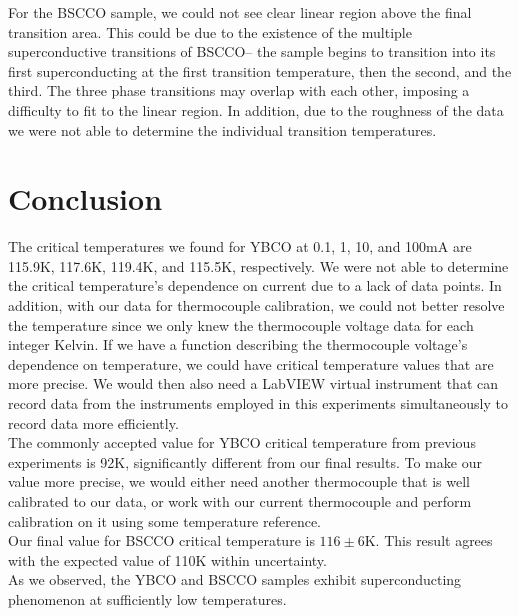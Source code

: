 \documentclass[prb,preprint]{revtex4-1}
\begin{document}
For the BSCCO sample, we could not see clear linear region above the final transition area. This could be due to the existence of the multiple superconductive transitions of BSCCO-- the sample begins to transition into its first superconducting at the first transition temperature, then the second, and the third. The three phase transitions may overlap with each other, imposing a difficulty to fit to the linear region. In addition, due to the roughness of the data we were not able to determine the individual transition temperatures. \\



\section{Conclusion}

The critical temperatures we found for YBCO at 0.1, 1, 10, and 100mA are 115.9K, 117.6K, 119.4K, and 115.5K, respectively. We were not able to determine the critical temperature's dependence on current due to a lack of data points. In addition, with our data for thermocouple calibration, we could not better resolve the temperature since we only knew the thermocouple voltage data for each integer Kelvin. If we have a function describing the thermocouple voltage's dependence on temperature, we could have critical temperature values that are more precise. We would then also need a LabVIEW virtual instrument that can record data from the instruments employed in this experiments simultaneously to record data more efficiently.\\

The commonly accepted value for YBCO critical temperature from previous experiments is 92K, significantly different from our final results. To make our value more precise, we would either need another thermocouple that is well calibrated to our data, or work with our current thermocouple and perform calibration on it using some temperature reference.\\

Our final value for BSCCO critical temperature is $116\pm6$K. This result agrees with the expected value of 110K within uncertainty. \\

As we observed, the YBCO and BSCCO samples exhibit superconducting phenomenon at sufficiently low temperatures.\\
\end{document}
